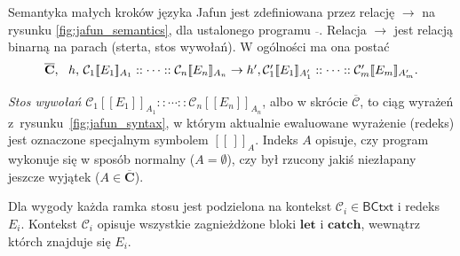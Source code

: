 \documentclass[]{pracamgr}
\renewcommand \| {\hspace{0.75em} | \hspace{0.75em} }
\renewcommand \[ {[\![}
\renewcommand \] {]\!]}
\newcommand \llbracket {[\![}
\newcommand \rrbracket {]\!]}
\theoremstyle{definition}
\newcommand{\jlet}{\mathbf{let}\xspace}
\newcommand{\jcatch}{\mathbf{catch}\xspace}
\newcommand{\BCtxt}{\mathsf{BCtxt}\xspace}
\newcommand{\ctxt}{\mathcal{C}\xspace}
\begin{document}
Semantyka małych kroków języka Jafun jest zdefiniowana przez relację $\rightarrow$ na rysunku \ref{fig:jafun_semantics},
dla ustalonego programu $\overline{\mathbf{}}$.
Relacja $\rightarrow$ jest relacją binarną na parach (sterta, stos wywołań).
W ogólności ma ona postać 
$$
  \begin{array}{l@{\;}l}
  \overline{\mathbf{C}},\ \ h,\,  \ctxt_1\llbracket E_1\rrbracket _{A_1}::\cdots:: & \ctxt_n\llbracket E_n\rrbracket _{A_n}\to
      h', \ctxt'_1\llbracket E_1\rrbracket _{A'_1}::\cdots:: \ctxt'_m\llbracket E_m\rrbracket _{A'_m}.
  \end{array}
$$

\emph{Stos wywołań}
$\ctxt_1\llbracket E_1\rrbracket _{A_1}::\cdots:: \ctxt_n\llbracket E_n\rrbracket _{A_n}$,
albo w skrócie \( \overline{\ctxt} \), to ciąg wyrażeń z~rysunku~\ref{fig:jafun_syntax},
w którym aktualnie ewaluowane wyrażenie (redeks) jest oznaczone specjalnym symbolem $\llbracket \,\rrbracket _A$.
Indeks $A$ opisuje, czy program wykonuje się w sposób normalny ($A=\emptyset$),
czy był rzucony jakiś niezłapany jeszcze wyjątek ($A\in \overline{\mathbf{C}}$).

Dla wygody każda ramka stosu jest podzielona na kontekst $\ctxt_i \in \BCtxt$ i redeks $E_i$.
Kontekst $\ctxt_i$ opisuje wszystkie zagnieżdżone bloki $\jlet$ i $\jcatch$, wewnątrz którch znajduje się $E_i$.
\end{document}
